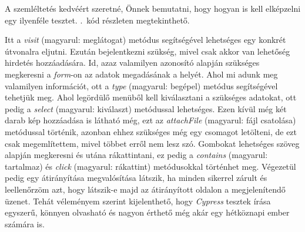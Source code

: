 \documentclass[]{thesis-ekf}
\theoremstyle{definition}
\theoremstyle{remark}
\begin{document}
		A szemléltetés kedvéért szeretné, Önnek bemutatni, hogy hogyan is kell elképzelni egy ilyenféle tesztet. .~kód részleten megtekinthető.
		
		
		
		Itt a \emph{visit} (magyarul: meglátogat) metódus segítségével lehetséges egy konkrét útvonalra eljutni. Ezután bejelentkezni szükség, mivel csak akkor van lehetőség hirdetés hozzáadására. Id, azaz valamilyen azonosító alapján szükséges megkeresni a \emph{form}-on az adatok megadásának a helyét. Ahol mi adunk meg valamilyen információt, ott a \emph{type} (magyarul: begépel) metódus segítségével tehetjük meg. Ahol legördülő menüből kell kiválasztani a szükséges adatokat, ott pedig a \emph{select} (magyarul: kiválaszt) metódussal lehetséges. Ezen kívül még két darab kép hozzáadása is látható még, ezt az \emph{attachFile} (magyarul: fájl csatolása) metódussal történik, azonban ehhez szükséges még egy csomagot letölteni, de ezt csak megemlítettem, mivel többet erről nem lesz szó. Gombokat lehetséges szöveg alapján megkeresni és utána rákattintani, ez pedig a \emph{contains} (magyarul: tartalmaz) és \emph{click} (magyarul: rákattint) metódusokkal történhet meg. Végezetül pedig egy átirányítása megvalósítása látszik, ha minden sikerrel zárult és leellenőrzöm azt, hogy látszik-e majd az átirányított oldalon a megjelenítendő üzenet. Tehát véleményem szerint kijelenthető, hogy \emph{Cypress} tesztek írása egyszerű, könnyen olvasható és nagyon érthető még akár egy hétköznapi ember számára is.
\end{document}
